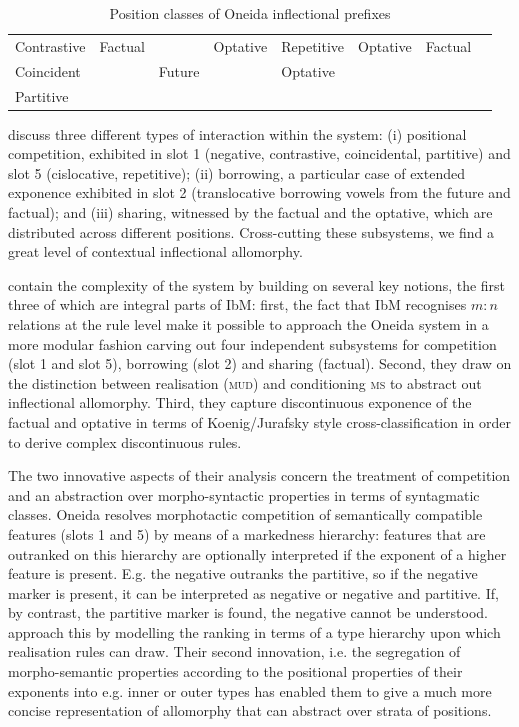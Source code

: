 \documentclass[output=paper
                ,modfonts
                ,nonflat
	        ,collection
	        ,collectionchapter
	        ,collectiontoclongg
 	        ,biblatex
                ,babelshorthands
                ,newtxmath
                ,draftmode
                ,colorlinks, citecolor=brown
] {langscibook}
\begin{document}
{\begin{table}[htb]
\begin{tabular}{l|l|l|l|l|l|l|l}
    Contrastive & Factual & & Optative & Repetitive & Optative &
                                                                 Factual
                 & \\
    Coincident & & Future & & Optative & &  \\
    Partitive & & & & & & &\\
    \bottomrule
  \end{tabular}
  \caption{Position classes of Oneida inflectional prefixes}
  \label{tab:Oneida}
\end{table}

\citet{diaz:koenig:michelson:19} discuss three different types of
interaction within the system: (i) positional competition, exhibited
in slot 1 (negative, contrastive, coincidental, partitive) and slot 5
(cislocative, repetitive); (ii) borrowing, a particular case of extended
exponence exhibited in slot 2 (translocative borrowing vowels from the
future and factual); and (iii) sharing, witnessed by the factual and
the optative, which are distributed across different positions. Cross-cutting these subsystems, we find a great level of
contextual inflectional allomorphy.

\citet{diaz:koenig:michelson:19} contain the complexity of the system
by building on several key notions, the first three of
which are integral parts of IbM: first, the fact that IbM recognises
$m:n$ relations at the rule level make it possible to approach the
Oneida system in a more modular fashion carving out four independent
subsystems for competition (slot 1 and slot 5), borrowing (slot 2) and
sharing (factual). Second, they draw on the distinction between
realisation (\textsc{mud}) and conditioning \textsc{ms} to abstract
out inflectional allomorphy. Third, they capture discontinuous
exponence of the factual and optative in terms of Koenig/Jurafsky
style cross-classification in order to derive complex discontinuous
rules.

The two innovative aspects of their analysis concern the treatment of
competition and an abstraction over morpho-syntactic properties in
terms of syntagmatic classes. Oneida resolves morphotactic competition
of semantically compatible features (slots 1 and 5) by means of a
markedness hierarchy: features that are outranked on this hierarchy
are optionally interpreted if the exponent of a higher feature is
present. E.g. the negative outranks the partitive, so if the negative
marker is present, it can be interpreted as negative or negative and
partitive. If, by contrast, the partitive marker is found, the
negative cannot be understood.  \citet{diaz:koenig:michelson:19}
approach this by modelling the ranking in terms of a type hierarchy
upon which realisation rules can draw. Their second innovation, i.e. 
the  segregation of morpho-semantic properties according to
the positional properties of their exponents into e.g. inner or outer
types has enabled them to give a much more concise representation of
allomorphy that can abstract over strata of positions. 

}
\end{document}
